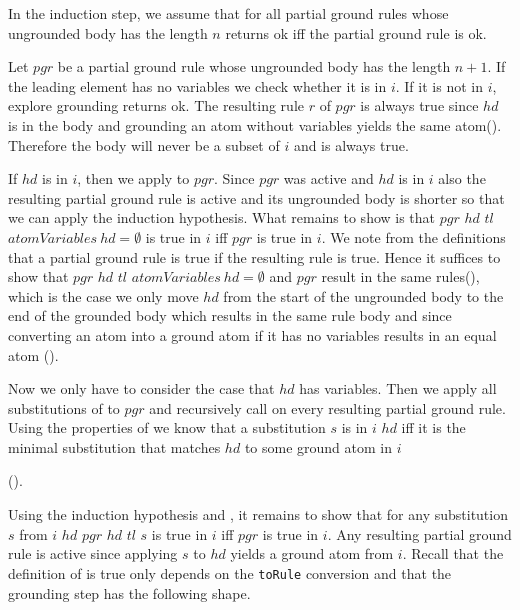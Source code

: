     In the induction step, we assume that for all partial ground rules whose ungrounded body has the length $n$ \exploreGrounding returns ok iff the partial ground rule is ok.

    Let $pgr$ be a partial ground rule whose ungrounded body has the length $n+1$. If the leading element has no variables we check whether it is in $i$. If it is not in $i$, explore grounding returns ok. The resulting rule $r$ of $pgr$ is always true since $hd$ is in the body and grounding an atom without variables yields the same atom(\groundingAtomWithoutVariablesYieldsSelf). Therefore the body will never be a subset of $i$ and is always true.

    If $hd$ is in $i$, then we apply \moveAtomWithoutVariables to $pgr$. Since $pgr$ was active and $hd$ is in $i$ also the resulting partial ground rule is active and its ungrounded body is shorter so that we can apply the induction hypothesis. What remains to show is that \moveAtomWithoutVariables $pgr$ $hd$ $tl$ $atomVariables\ hd = \emptyset$ is true in $i$ iff $pgr$ is true in $i$. We note from the definitions that a partial ground rule is true if the resulting rule is true. Hence it suffices to show that \moveAtomWithoutVariables $pgr$ $hd$ $tl$ $atomVariables\ hd = \emptyset$ and $pgr$ result in the same rules(\partialGroundRuleisTrueofequaltoRule), which is the case we only move $hd$ from the start of the ungrounded body to the end of the grounded body which results in the same rule body and since converting an atom into a ground atom if it has no variables results in an equal atom (\groundAtomToAtomOfAtomWithoutVariablesToGroundAtomIsSelf).

    Now we only have to consider the case that $hd$ has variables. Then we apply all substitutions of \getSubstitutions to $pgr$ and recursively call \exploreGrounding on every resulting partial ground rule. Using the properties of \matchAtom we know that a substitution $s$ is in \getSubstitutions $i$ $hd$ iff it is the minimal substitution that matches $hd$ to some ground atom in $i$ 
    
    (\inGetSubstitutionsIffMinimalSolutionAndInInterpretation).

    Using the induction hypothesis and \ListmapexceptunitIsUnitIffAll, it remains to show that for any substitution $s$ from \getSubstitutions $i$ $hd$ \groundingStep $pgr$ $hd$ $tl$ $s$ is true in $i$ iff $pgr$ is true in $i$. Any resulting partial ground rule is active since applying $s$ to $hd$ yields a ground atom from $i$. Recall that the definition of is true only depends on the \lstinline|toRule| conversion and that the grounding step has the following shape.

